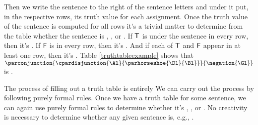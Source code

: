 Then we write the sentence to the right of the sentence letters and under it put, in the respective rows, its truth value for each assignment. 
Once the truth value of the sentence is computed for all rows it's a trivial matter to determine from the table whether the sentence is , , or . 
If $\mathsf{T}$ is under the sentence in every row, then it's . 
If $\mathsf{F}$ is in every row, then it's .
And if each of $\mathsf{T}$ and $\mathsf{F}$ appear in at least one row, then it's . 
Table \ref{truthtableexample} shows that $\parconjunction{\cpardisjunction{\Al}{\parhorseshoe{\Dl}{\Bl}}}{\negation{\Gl}}$ is .

The process of filling out a truth table is entirely 
We can carry out the process by following purely formal rules.
Once we have a truth table for some \GSL{} sentence, we can again use purely formal rules to determine whether it's , , or .
No creativity is necessary to determine whether any given sentence is, e.g., .

